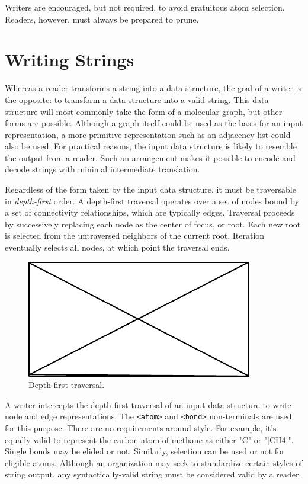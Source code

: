 \documentclass{article}
\def\ttt{\texttt}
\begin{document}
Writers are encouraged, but not required, to avoid gratuitous atom selection. Readers, however, must always be prepared to prune.

\section*{Writing Strings}

Whereas a reader transforms a string into a data structure, the goal of a writer is the opposite: to transform a data structure into a valid string. This data structure will most commonly take the form of a molecular graph, but other forms are possible. Although a graph itself could be used as the basis for an input representation, a more primitive representation such as an adjacency list could also be used. For practical reasons, the input data structure is likely to resemble the output from a reader. Such an arrangement makes it possible to encode and decode strings with minimal intermediate translation.

Regardless of the form taken by the input data structure, it must be traversable in \textit{depth-first} order. A depth-first traversal operates over a set of nodes bound by a set of connectivity relationships, which are typically edges. Traversal proceeds by successively replacing each node as the center of focus, or root. Each new root is selected from the untraversed neighbors of the current root. Iteration eventually selects all nodes, at which point the traversal ends.

\begin{figure}
    \centering
    \includegraphics{filler}
    \caption{Depth-first traversal.}
    \label{fig:depth-first-traversal}
\end{figure}

A writer intercepts the depth-first traversal of an input data structure to write node and edge representations. The \ttt{<atom>} and \ttt{<bond>} non-terminals are used for this purpose. There are no requirements around style. For example, it's equally valid to represent the carbon atom of methane as either "C" or "[CH4]". Single bonds may be elided or not. Similarly, selection can be used or not for eligible atoms. Although an organization may seek to standardize certain styles of string output, any syntactically-valid string must be considered valid by a reader.
\end{document}

